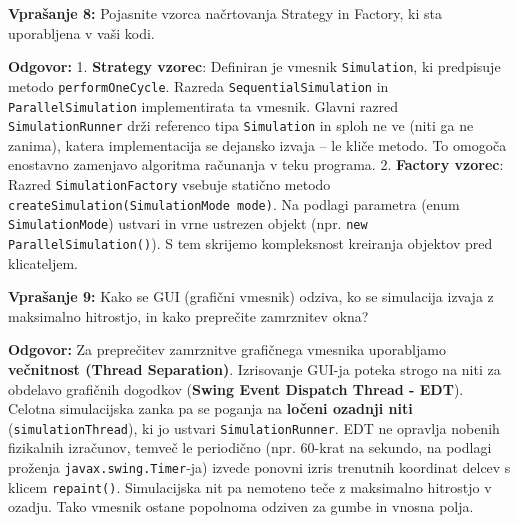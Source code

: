 \documentclass[11pt,a4paper]{article}
\begin{document}
\begin{vprasanje}
\textbf{Vprašanje 8:} Pojasnite vzorca načrtovanja Strategy in Factory, ki sta uporabljena v vaši kodi.

\textbf{Odgovor:}
1. \textbf{Strategy vzorec}: Definiran je vmesnik \texttt{Simulation}, ki predpisuje metodo \texttt{performOneCycle}. Razreda \texttt{SequentialSimulation} in \texttt{ParallelSimulation} implementirata ta vmesnik. Glavni razred \texttt{SimulationRunner} drži referenco tipa \texttt{Simulation} in sploh ne ve (niti ga ne zanima), katera implementacija se dejansko izvaja -- le kliče metodo. To omogoča enostavno zamenjavo algoritma računanja v teku programa.
2. \textbf{Factory vzorec}: Razred \texttt{SimulationFactory} vsebuje statično metodo \texttt{createSimulation(SimulationMode mode)}. Na podlagi parametra (enum \texttt{SimulationMode}) ustvari in vrne ustrezen objekt (npr. \texttt{new ParallelSimulation()}). S tem skrijemo kompleksnost kreiranja objektov pred klicateljem.
\end{vprasanje}

\begin{vprasanje}
\textbf{Vprašanje 9:} Kako se GUI (grafični vmesnik) odziva, ko se simulacija izvaja z maksimalno hitrostjo, in kako preprečite zamrznitev okna?

\textbf{Odgovor:}
Za preprečitev zamrznitve grafičnega vmesnika uporabljamo \textbf{večnitnost (Thread Separation)}.
Izrisovanje GUI-ja poteka strogo na niti za obdelavo grafičnih dogodkov (\textbf{Swing Event Dispatch Thread - EDT}). Celotna simulacijska zanka pa se poganja na \textbf{ločeni ozadnji niti} (\texttt{simulationThread}), ki jo ustvari \texttt{SimulationRunner}. 
EDT ne opravlja nobenih fizikalnih izračunov, temveč le periodično (npr. 60-krat na sekundo, na podlagi proženja \texttt{javax.swing.Timer}-ja) izvede ponovni izris trenutnih koordinat delcev s klicem \texttt{repaint()}. Simulacijska nit pa nemoteno teče z maksimalno hitrostjo v ozadju. Tako vmesnik ostane popolnoma odziven za gumbe in vnosna polja.
\end{vprasanje}
\end{document}
